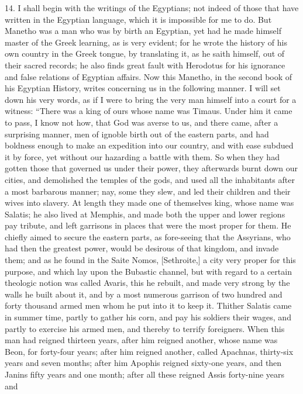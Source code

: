 14. I shall begin with the writings of the Egyptians; not indeed of those
that have written in the Egyptian language, which it is impossible for me
to do. But Manetho was a man who was by birth an Egyptian, yet had he made
himself master of the Greek learning, as is very evident; for he wrote the
history of his own country in the Greek tongue, by translating it, as he
saith himself, out of their sacred records; he also finds great fault with
Herodotus for his ignorance and false relations of Egyptian affairs. Now
this Manetho, in the second book of his Egyptian History, writes
concerning us in the following manner. I will set down his very words, as
if I were to bring the very man himself into a court for a witness: ``There
was a king of ours whose name was Timaus. Under him it came to pass, I
know not how, that God was averse to us, and there came, after a
surprising manner, men of ignoble birth out of the eastern parts, and had
boldness enough to make an expedition into our country, and with ease
subdued it by force, yet without our hazarding a battle with them. So when
they had gotten those that governed us under their power, they afterwards
burnt down our cities, and demolished the temples of the gods, and used
all the inhabitants after a most barbarous manner; nay, some they slew,
and led their children and their wives into slavery. At length they made
one of themselves king, whose name was Salatis; he also lived at Memphis,
and made both the upper and lower regions pay tribute, and left garrisons
in places that were the most proper for them. He chiefly aimed to secure
the eastern parts, as fore-seeing that the Assyrians, who had then the
greatest power, would be desirous of that kingdom, and invade them; and as
he found in the Saite Nomos, [Sethroite,] a city very proper for this
purpose, and which lay upon the Bubastic channel, but with regard to a
certain theologic notion was called Avaris, this he rebuilt, and made very
strong by the walls he built about it, and by a most numerous garrison of
two hundred and forty thousand armed men whom he put into it to keep it.
Thither Salatis came in summer time, partly to gather his corn, and pay
his soldiers their wages, and partly to exercise his armed men, and
thereby to terrify foreigners. When this man had reigned thirteen years,
after him reigned another, whose name was Beon, for forty-four years;
after him reigned another, called Apachnas, thirty-six years and seven
months; after him Apophis reigned sixty-one years, and then Janins fifty
years and one month; after all these reigned Assis forty-nine years and

